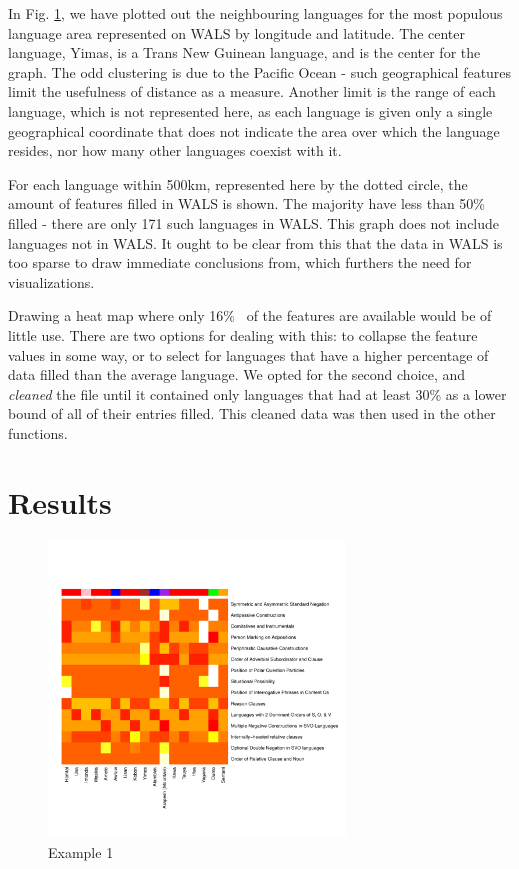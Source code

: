\documentclass[11pt]{article}
\begin{document}
In Fig. \ref{fig:sparse}, we have plotted out the neighbouring languages for the most populous language area represented on WALS by longitude and latitude. The center language, Yimas, is a Trans New Guinean language, and is the center for the graph. The odd clustering is due to the Pacific Ocean - such geographical features limit the usefulness of distance as a measure. Another limit is the range of each language, which is not represented here, as each language is given only a single geographical coordinate that does not indicate the area over which the language resides, nor how many other languages coexist with it.

For each language within 500km, represented here by the dotted circle, the amount of features filled in WALS is shown. The majority have less than 50\% filled - there are only 171 such languages in WALS. This graph does not include languages not in WALS. It ought to be clear from this that the data in WALS is too sparse to draw immediate conclusions from, which furthers the need for visualizations. 

Drawing a heat map where only 16\%~ of the features are available would be of little use. There are two options for dealing with this: to collapse the feature values in some way, or to select for languages that have a higher percentage of data filled than the average language. We opted for the second choice, and \emph{cleaned}  the file until it contained only languages that had at least 30\% as a lower bound of all of their entries filled. This cleaned data was then used in the other functions.  

\section{Results} %

\begin{figure}[h]
\includegraphics[width=3.1in]
{graph2yimas.pdf} 
\caption{Example 1} 
\label{fig:sparse} 
\end{figure}
\end{document}
